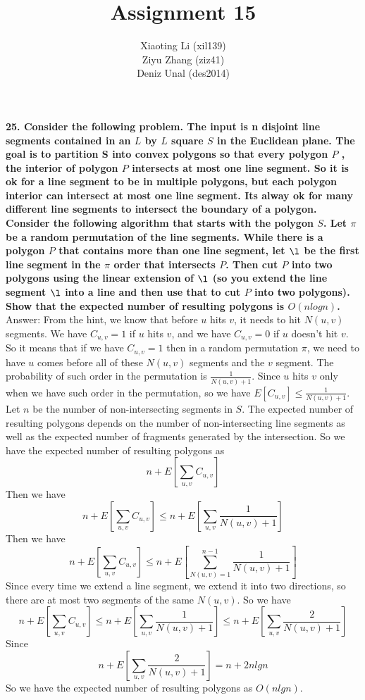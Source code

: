 \documentclass{article}
\title{Assignment 15}
\author{Xiaoting Li (xil139) \\
Ziyu Zhang (ziz41) \\
Deniz Unal (des2014)}
\date{}
\begin{document}
\maketitle

\noindent
\textbf{25. Consider the following problem. The input is n disjoint line segments contained in an $L$ by $L$ square $S$ in the Euclidean plane. The goal is to partition S into convex polygons so that every polygon $P$ , the interior of polygon $P$ intersects at most one line segment. So it is ok for a line segment to be in multiple polygons, but each polygon interior can intersect at most one line segment. Its alway ok for many different line segments to intersect the boundary of a polygon. \\ \newline 
Consider the following algorithm that starts with the polygon $S$. Let $\pi$ be a random permutation of the line segments. While there is a polygon $P$ that contains more than one line segment, let $\l$ be the first line segment in the $\pi$ order that intersects $P$. Then cut $P$ into two polygons using the linear extension of $\l$ (so you extend the line segment $\l$ into a line and then use that to cut $P$ into two polygons). Show that the expected number of resulting polygons is $O(n log n)$.} \\ \newline
Answer: From the hint, we know that before $u$ hits $v$, it needs to hit $N(u, v)$ segments. We have $C_{u,v} = 1$ if $u$ hits $v$, and we have $C_{u,v} = 0$ if $u$ doesn't hit $v$. So it means that if we have $C_{u,v} = 1$ then in a random permutation $\pi$, we need to have $u$ comes before all of these $N(u, v)$ segments and the $v$ segment. The probability of such order in the permutation is $\frac{1}{N(u, v) + 1}$. Since $u$ hits $v$ only when we have such order in the permutation, so we have $E[C_{u,v}] \leq \frac{1}{N(u, v) + 1}$. Let $n$ be the number of non-intersecting segments in $S$. The expected number of resulting polygons depends on the number of non-intersecting line segments as well as the expected number of fragments generated by the intersection. So we have the expected number of resulting polygons as 
$$n + E[\sum_{u,v}C_{u,v}]$$
Then we have
$$n + E[\sum_{u, v}C_{u,v}] \leq n + E[\sum_{u, v}\frac{1}{N(u, v) + 1}]$$
Then we have
$$n + E[\sum_{u, v}C_{u,v}] \leq n + E[\sum_{N(u, v) = 1}^{n - 1}\frac{1}{N(u, v) + 1}]$$
Since every time we extend a line segment, we extend it into two directions, so there are at most two segments of the same $N(u, v)$. So we have
$$n + E[\sum_{u, v}C_{u,v}] \leq n + E[\sum_{u, v}\frac{1}{N(u, v) + 1}] \leq n + E[\sum_{u, v}\frac{2}{N(u, v) + 1}]$$
Since 
$$ n + E[\sum_{u, v}\frac{2}{N(u, v) + 1}] = n + 2nlg{n}$$
So we have the expected number of resulting polygons as $O(nlg{n})$.
\end{document}
